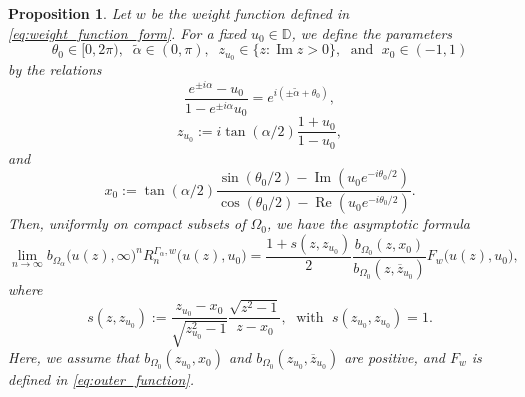 \documentclass[12pt,oneside,reqno]{amsart}
\newtheorem{proposition}[theorem]{Proposition}
\theoremstyle{definition}
\numberwithin{equation}{section}
\newcommand{\D}{{\mathbb D}}
\renewcommand{\Re}{\operatorname{Re}}
\renewcommand{\Im}{\operatorname{Im}}
\begin{document}
\begin{proposition}
	Let $w$ be the weight function defined in \eqref{eq:weight_function_form}. For a fixed $u_0\in \D$, we define the parameters
\[
   \theta_0\in [0,2\pi), \;\; \tilde{\alpha}\in (0,\pi), \;\; z_{u_0}\in\{z : \Im z>0\}, 
   \; \mbox{ and } \; x_0\in (-1,1)
\] 	
    by the relations
	\begin{equation}
		\frac{e^{\pm i\alpha}-u_0}{1-e^{\pm i\alpha}u_0} = e^{i(\pm \tilde\alpha+\theta_0)},
		\label{eq:def_theta_0}
	\end{equation}
	\begin{equation}
		z_{u_0} := i\tan(\alpha/2)\frac{1+u_0}{1-u_0},
		\label{eq:z_u_0_def}
	\end{equation}
	and
	\begin{equation}
	x_0:=\tan(\alpha/2)\frac{\sin(\theta_0/2)-\Im(u_0e^{-i\theta_0/2})}{\cos(\theta_0/2)-\Re(u_0e^{-i\theta_0/2})}.
	\label{eq:x_0_def}
	\end{equation}
	Then, uniformly on compact subsets of $\Omega_0$, we have the asymptotic formula
	\begin{equation}
		\lim_{n\rightarrow \infty}b_{\Omega_\alpha}\bigl(u(z),\infty\bigr)^{n}R_{n}^{\Gamma_\alpha,w}\bigl(u(z),u_0\bigr) = \frac{1+s(z,z_{u_0})}{2}\frac{b_{\Omega_0}(z,x_0)}{b_{\Omega_0}(z,\overline{z}_{u_0})}F_w\bigl(u(z),u_0\bigr),
		\label{eq:asymptotics_z_domain}
	\end{equation}
	where
	\begin{equation} \label{su}
	s(z,z_{u_0}):=\frac{z_{u_0}-x_0}{\sqrt{z_{u_0}^2-1}}\frac{\sqrt{z^2-1}}{z-x_0},
	\; \mbox{ with } \; s(z_{u_0},z_{u_0})=1. \end{equation}
Here, we assume that $b_{\Omega_0}(z_{u_0}, x_0)$ and $b_{\Omega_0}(z_{u_0}, \overline{z}_{u_0})$ are positive, and $F_w$ is defined in \eqref{eq:outer_function}. 
	\label{prop:main_propsition}
\end{proposition}
\end{document}
